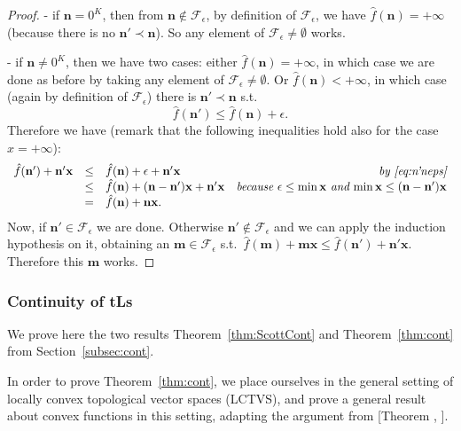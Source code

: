 \begin{proof}
- if $\mathbf n=0^{K}$, then from $\mathbf  n\notin \mathcal F_{\epsilon}$, by definition of $\mathcal F_\epsilon$, we have $\hat f(\mathbf n)=+\infty$ (because there is no $\mathbf n'\prec\mathbf n$).
So any element of $\mathcal F_\epsilon\neq\emptyset$ works.

- if $\mathbf n\neq 0^{K}$, then we have two cases:
either $\hat f(\mathbf n)=+\infty$, in which case we are done as before by taking any element of $\mathcal F_\epsilon\neq\emptyset$.
Or $\hat f(\mathbf n)<+\infty$, in which case (again by definition of $\mathcal F_\epsilon$) there is $\mathbf n'\prec\mathbf n$ s.t.\ \begin{equation}\label{eq:n'neps} \hat f(\mathbf n')\leq \hat f(\mathbf n)+\epsilon.\end{equation}
Therefore we have (remark that the following inequalities hold also for the case $x=+\infty$):
\[\begin{array}{rclr}
 \hat f(\mathbf n')+\mathbf n'\mathbf x & \leq & \hat f(\mathbf n) + \epsilon +\mathbf  n'\mathbf x & \textit{by \eqref{eq:n'neps}} \\
 & \leq & \hat f(\mathbf n) + (\mathbf n-\mathbf n')\mathbf x + \mathbf n'\mathbf x & \textit{because $\epsilon\leq\min\mathbf x$ and $\min \mathbf x\leq(\mathbf n-\mathbf  n')\mathbf x$} \\
 & = & \hat f(\mathbf n)+ \mathbf n\mathbf x. &
\end{array}\]
Now, if $\mathbf n'\in\mathcal F_\epsilon$ we are done.
Otherwise $\mathbf n'\notin\mathcal F_\epsilon$ and we can apply the induction hypothesis on it, obtaining an $\mathbf m\in\mathcal F_\epsilon$ s.t.\ $\hat f(\mathbf m)+\mathbf m\mathbf x \leq \hat f(\mathbf n')+\mathbf n'\mathbf x$.
Therefore this $\mathbf m$ works.
\end{proof}

\newpage

\subsubsection{Continuity of tLs}

We prove here the two results Theorem~\ref{thm:ScottCont} and Theorem~\ref{thm:cont} from Section~\ref{subsec:cont}.

In order to prove Theorem~\ref{thm:cont}, we place ourselves in the general setting of locally convex topological vector spaces (LCTVS), and prove a general result about convex functions in this setting, adapting the argument from [Theorem , \cite{}].

